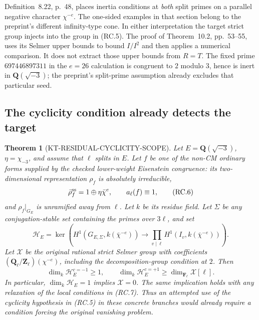 \documentclass[11pt,a4paper]{article}
\newtheorem{theorem}{Theorem}[section]
\theoremstyle{definition}
\begin{document}
Definition~8.22, p.~48, places inertia conditions at
\emph{both} split primes on a parallel negative character
$\chi^{-e}$.  The one-sided examples in that section
belong to the preprint's different infinity-type cone.
In either interpretation the target strict group injects
into the group in (RC.5).  The proof of Theorem~10.2,
pp.~53--55, uses its Selmer upper bounds to bound
$I/I^2$ and then applies a numerical comparison.
It does not extract those upper bounds from $R=T$.
The fixed prime $697446897311$ in the $e=26$ calculation
is congruent to $2$ modulo $3$, hence is inert in
$\mathbf Q(\sqrt{-3})$; the preprint's split-prime
assumption already excludes that particular seed.

\subsection{The cyclicity condition already detects the target}

\begin{theorem}[KT-RESIDUAL-CYCLICITY-SCOPE]
Let $E=\mathbf Q(\sqrt{-3})$, $\eta=\chi_{-3}$,
and assume that $\ell$ splits in $E$.  Let $f$ be one
of the non-CM ordinary forms supplied by the checked
lower-weight Eisenstein congruence: its two-dimensional
representation $\rho_f$ is absolutely irreducible,
\[
 \bar\rho_f^{\rm ss}=1\oplus\eta\bar\chi^e,
 \qquad a_\ell(f)\equiv1,
                                                               \tag{RC.6}
\]
and $\rho_f|_{G_E}$ is unramified away from $\ell$.
Let $k$ be its residue field.  Let $\Sigma$ be any
conjugation-stable set containing the primes over
$3\ell$, and set
\[
 \mathcal H_E=
 \ker\left(H^1(G_{E,\Sigma},k(\bar\chi^{-e}))
       \longrightarrow\prod_{v\mid\ell}
                         H^1(I_v,k(\bar\chi^{-e}))\right).
                                                               \tag{RC.7}
\]
Let $\mathcal X$ be the original rational strict
Selmer group with coefficients
$(\mathbf Q_\ell/\mathbf Z_\ell)(\chi^{-e})$,
including the decomposition-group condition at $2$.
Then
\[
 \dim_k\mathcal H_E^{c=-1}\geq1,\qquad
 \dim_k\mathcal H_E^{c=+1}
          \geq\dim_{\mathbf F_\ell}\mathcal X[\ell].
                                                               \tag{RC.8}
\]
In particular, $\dim_k\mathcal H_E=1$ implies
$\mathcal X=0$.  The same implication holds with any
relaxation of the local conditions in (RC.7).
Thus an attempted use of the cyclicity hypothesis in
(RC.5) in these concrete branches would already require
a condition forcing the original vanishing problem.
\end{theorem}
\end{document}
